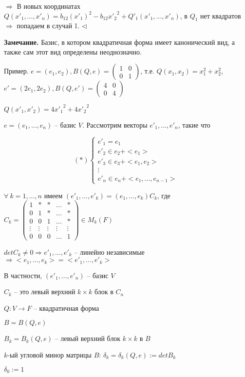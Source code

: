 $\Rightarrow$ В новых координатах $Q(x'_1, \dots, x'_n) = b_{12} (x'_1)^2 - b_{12} {x'_2}^2 + Q'_1(x'_1, \dots, x'_n)$, в $Q_1$ нет квадратов $\Rightarrow$ попадаем в случай 1. $\lhd$

\bigskip
\textbf{Замечание.} Базис, в котором квадратичная форма имеет канонический вид, а также сам этот вид определены неоднозначно.

\bigskip
Пример. $e = (e_1, e_2), B(Q, e) = \begin{pmatrix} 1 & 0 \\ 0 & 1 \end{pmatrix}$, т.е. $Q(x_1, x_2) = x_1^2 + x_2^2$, $e' = (2e_1, 2e_2), B(Q, e') = \begin{pmatrix} 4 & 0 \\ 0 & 4 \end{pmatrix}$

$Q(x'_1, x'_2) = 4{x'_1}^2 + 4{x'_2}^2$

\bigskip
$e = (e_1, \dots, e_n)$ -- базис $V$. Рассмотрим векторы $e'_1, \dots, e'_n$, такие что  

\begin{equation*}
(*) \begin{cases}
		e'_1 = e_1 \\
		e'_2 \in e_2 + <e_1> \\
        e'_3 \in e_3 + <e_1, e_2> \\
        \vdots \\
        e'_n \in e_n + <e_1, \dots, e_{n-1}>
	\end{cases}
\end{equation*}  

$\forall \ k = 1, \dots, n$ имеем $(e'_1, \dots, e'_k) = (e_1, \dots, e_k) C_k$, где $C_k = \begin{pmatrix} 1 & * & * & \dots & * \\ 0 & 1 & * & \dots & * \\ 0 & 0 & 1 & \dots & * \\ \vdots & \vdots & \vdots & \vdots & \vdots \\ 0 & 0 & 0 & \dots & 1 \end{pmatrix} \in M_k(F)$

$det C_k \neq 0 \Rightarrow e'_1, \dots, e'_k$ -- линейно независимые $\Rightarrow <e_1, \dots, e_k> = <e'_1, \dots, e'_k>$

В частности, $(e'_1, \dots, e'_n)$ -- базис $V$

$C_k$ -- это левый верхний $k \times k$ блок в $C_n$

\bigskip
$Q: V \rightarrow F$ -- квадратичная форма

$B = B(Q, e)$

$B_k = B_k(Q, e)$ -- левый верхний блок $k \times k$ в $B$

$k$-ый угловой минор матрицы $B$: $\delta_k = \delta_k(Q, e) := detB_k$

$\delta_0 := 1$

